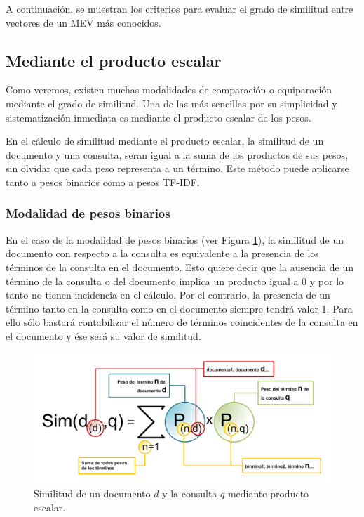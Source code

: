 \documentclass[titlepage]{article}
\begin{document}
A continuación, se muestran los criterios para evaluar el grado de similitud entre vectores de un MEV más conocidos.

\subsection{Mediante el producto escalar}

Como veremos, existen muchas modalidades de comparación o equiparación mediante el grado de similitud. Una de las más sencillas por su simplicidad y sistematización inmediata es mediante el producto escalar de los pesos.

En el cálculo de similitud mediante el producto escalar, la similitud de un documento y una consulta, seran igual a la suma de los productos de sus pesos, sin olvidar que cada peso representa a un término. Este método puede aplicarse tanto a pesos binarios como a pesos TF-IDF.

\subsubsection{Modalidad de pesos binarios}

En el caso de la modalidad de pesos binarios (ver Figura \ref{fig: Figure 1}), la similitud de un documento con respecto a la consulta es equivalente a la presencia de los términos de la consulta en el documento. Esto quiere decir que la ausencia de un término de la consulta o del documento implica un producto igual a 0 y por lo tanto no tienen incidencia en el cálculo. Por el contrario, la presencia de un término tanto en la consulta como en el documento siempre tendrá valor 1. Para ello sólo bastará contabilizar el número de términos coincidentes de la consulta en el documento y ése será su valor de similitud.

\begin{figure}[h]
	\begin{center}
		\includegraphics*[scale=0.7]{similitud_producto_escalar.png}
	\end{center}
	\caption{Similitud de un documento $d$ y la consulta $q$ mediante producto escalar.}
	\label{fig: Figure 1}
\end{figure}
\end{document}
